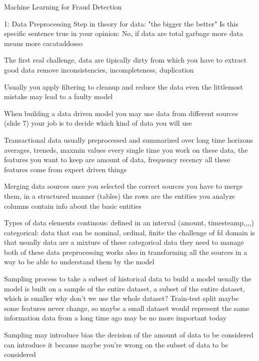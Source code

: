 Machine Learning for Fraud Detection

1: Data Preprocessing Step
    in theory for data: "the bigger the better"
    Is this specific sentence true in your opinion:
        No, if data are total garbage more data means more cacataddosso

        The first real challenge, data are tipically dirty
            from which you have to extract good data 
            remove inconsistencies, incompleteness, duplication

            Usually you apply filtering to cleanup and reduce the data 
            even the littlemost mistake may lead to a faulty model 

    When building a data driven model you may use data from different sources (slide 7)
        your job is to decide which kind of data you will use 
    
    Transactional data 
        usually preprocessed and summarized over long time horizons 
        averages, treneds, maxmin values
        every single time you work on these data, the features you want to keep are amount of data, frequency recency
        all these features come from expert driven things

    Merging data sources 
        once you selected the correct sources you have to merge them, in a structured manner (tables) 
            the rows are the entities you analyze
            columns contain info about the basic entities

    Types of data elements
        continous: defined in an interval (amount, timesteamp,,,,)
        categorical: data that can be nominal, ordinal, finite 
            the challenge of fd domain is that usually data are a mixture of these categorical data 
            they need to manage both of these data 
            preprocessing works also in transforming all the sources in a way to be able to understand them by the model 

    Sampling 
        process to take a subset of historical data to build a model 
        usually the model is built on a sample of the entire dataset, a subset of the entire dataset, which is smaller
        why don't we use the whole dataset?
            Train-test split 
            maybe some features never change, so maybe a small dataset would represent the same information
            data from a long time ago may be no more important today

        Sampling may introduce bias 
            the decision of the amount of data to be considered can introduce it because maybe you're wrong on the subset of data to be considered 

